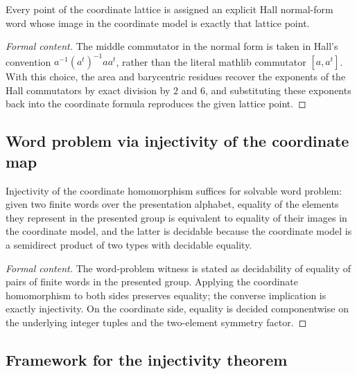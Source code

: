 \begin{proposition}
Every point of the coordinate lattice is assigned an explicit Hall normal-form word whose image in
the coordinate model is exactly that lattice point.
\end{proposition}

\begin{proof}[Formal content]
The middle commutator in the normal form is taken in Hall's convention
$a^{-1}(a^t)^{-1}a a^t$, rather than the literal mathlib commutator $[a,a^t]$. With this choice,
the area and barycentric residues recover the exponents of the Hall commutators by exact division
by $2$ and $6$, and substituting these exponents back into the coordinate formula reproduces the
given lattice point.
\end{proof}

\subsection*{Word problem via injectivity of the coordinate map}

\begin{proposition}
Injectivity of the coordinate homomorphism suffices for solvable word problem: given
two finite words over the presentation alphabet, equality of the elements they represent in the
presented group is equivalent to equality of their images in the coordinate model, and the latter
is decidable because the coordinate model is a semidirect product of two types with decidable
equality.
\end{proposition}

\begin{proof}[Formal content]
The word-problem witness is stated as decidability of equality of pairs of finite words in the
presented group. Applying the coordinate homomorphism to both sides preserves equality; the
converse implication is exactly injectivity. On the coordinate side, equality is decided
componentwise on the underlying integer tuples and the two-element symmetry factor.
\end{proof}

\subsection*{Framework for the injectivity theorem}

